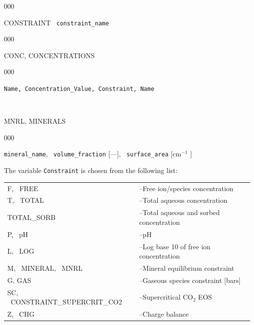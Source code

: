 \documentclass[12pt]{article}
\begin{document}
\begin{deflist}{000}
\item [CONSTRAINT] \ {\tt constraint\_name}
\begin{deflist}{000}
\item[CONC, CONCENTRATIONS] ~
\begin{deflist}{000}
\item[{\tt Name, Concentration\_Value, Constraint, Name}] ~
\end{deflist}
\item[\keyend] ~


\item[MNRL, MINERALS] ~

\begin{deflist}{000}
\item[{\tt mineral\_name}, \ {\tt volume\_fraction} {[---]}, \ {\tt surface\_area} [cm$^{-1}$]]
\end{deflist}
\item[\keyend]
\end{deflist}
\item[\keyend]
\end{deflist}


The variable {\tt Constraint} is chosen from the following list:


\begin{tabular}{ll}
F, \ FREE & --Free ion/species concentration\\
T, \ TOTAL & --Total aqueous concentration\\
TOTAL\_SORB & --Total aqueous and sorbed concentration\\
P, \ pH & --pH\\
L, \ LOG & --Log base 10 of free ion concentration\\
M, \ MINERAL, \ MNRL & --Mineral equilibrium constraint\\
G, GAS & --Gaseous species constraint [bars]\\
SC, \ CONSTRAINT\_SUPERCRIT\_CO2 & --Supercritical CO$_2$ EOS\\
Z, \ CHG & --Charge balance
\end{tabular}
\end{document}
